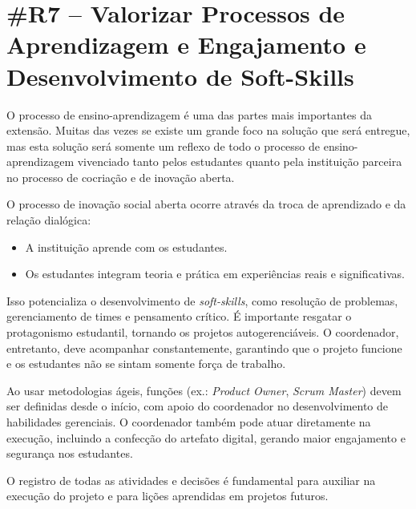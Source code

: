 \section*{\#R7 – Valorizar Processos de Aprendizagem e Engajamento e Desenvolvimento de Soft-Skills}

O processo de ensino-aprendizagem é uma das partes mais importantes da extensão. Muitas das vezes se existe um grande foco na solução que será entregue, mas esta solução será somente um reflexo de todo o processo de ensino-aprendizagem vivenciado tanto pelos estudantes quanto pela instituição parceira no processo de cocriação e de inovação aberta.

O processo de inovação social aberta ocorre através da troca de aprendizado e da relação dialógica:
\begin{itemize}
    \item A instituição aprende com os estudantes.
    \item Os estudantes integram teoria e prática em experiências reais e significativas.
\end{itemize}

Isso potencializa o desenvolvimento de \textit{soft-skills}, como resolução de problemas, gerenciamento de times e pensamento crítico. É importante resgatar o protagonismo estudantil, tornando os projetos autogerenciáveis. O coordenador, entretanto, deve acompanhar constantemente, garantindo que o projeto funcione e os estudantes não se sintam somente força de trabalho.

Ao usar metodologias ágeis, funções (ex.: \textit{Product Owner}, \textit{Scrum Master}) devem ser definidas desde o início, com apoio do coordenador no desenvolvimento de habilidades gerenciais. O coordenador também pode atuar diretamente na execução, incluindo a confecção do artefato digital, gerando maior engajamento e segurança nos estudantes.

O registro de todas as atividades e decisões é fundamental para auxiliar na execução do projeto e para lições aprendidas em projetos futuros.
